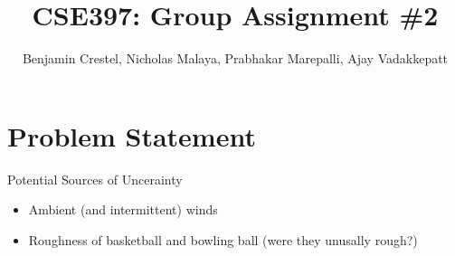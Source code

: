 \documentclass{article}
\title{\bf{CSE397: Group Assignment \#2}}
\author{Benjamin Crestel, Nicholas Malaya, Prabhakar Marepalli, Ajay Vadakkepatt}
\date{}
\begin{document}
\maketitle

\newpage
\section{Problem Statement}

Potential Sources of Uncerainty
\begin{itemize}
\item Ambient (and intermittent) winds
\item Roughness of basketball and bowling ball (were they unusally rough?)
\end{itemize}
\end{document}
